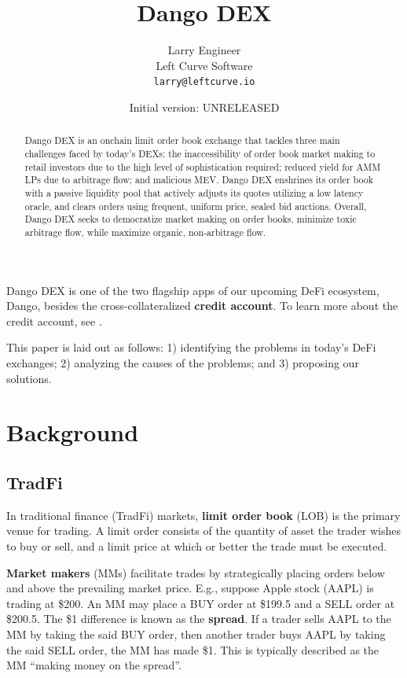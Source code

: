 \documentclass{article}
\title{Dango DEX}
\author{
  Larry Engineer \\
	Left Curve Software \\
	\texttt{larry@leftcurve.io} \\
}
\date{Initial version: UNRELEASED}
\begin{document}
\maketitle

\begin{abstract}
  Dango DEX is an onchain limit order book exchange that tackles three main challenges faced by today's DEXs: the inaccessibility of order book market making to retail investors due to the high level of sophistication required; reduced yield for AMM LPs due to arbitrage flow; and malicious MEV. Dango DEX enshrines its order book with a passive liquidity pool that actively adjusts its quotes utilizing a low latency oracle, and clears orders using frequent, uniform price, sealed bid auctions. Overall, Dango DEX seeks to democratize market making on order books, minimize toxic arbitrage flow, while maximize organic, non-arbitrage flow.
\end{abstract}

Dango DEX is one of the two flagship apps of our upcoming DeFi ecosystem, Dango,\supercite{dangotwitter} besides the cross-collateralized \textbf{credit account}. To learn more about the credit account, see \cite{creditaccountmarsforum,creditaccountbuidlkeynote}.

This paper is laid out as follows: 1) identifying the problems in today's DeFi exchanges; 2) analyzing the causes of the problems; and 3) proposing our solutions.

\section{Background}

\subsection{TradFi}

In traditional finance (TradFi) markets, \textbf{limit order book} (LOB) is the primary venue for trading. A limit order consists of the quantity of asset the trader wishes to buy or sell, and a limit price at which or better the trade must be executed.

\textbf{Market makers} (MMs) facilitate trades by strategically placing orders below and above the prevailing market price. E.g., suppose Apple stock (AAPL) is trading at \$200. An MM may place a BUY order at \$199.5 and a SELL order at \$200.5. The \$1 difference is known as the \textbf{spread}. If a trader sells AAPL to the MM by taking the said BUY order, then another trader buys AAPL by taking the said SELL order, the MM has made \$1. This is typically described as the MM ``making money on the spread''.
\end{document}
